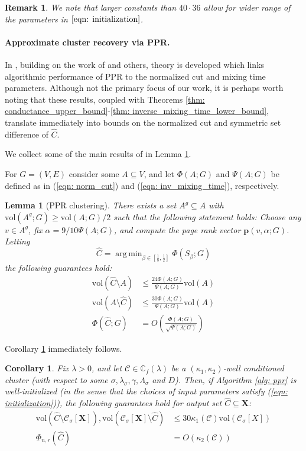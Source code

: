\documentclass{article}
\newcommand{\vol}{\mathrm{vol}}
\newcommand{\1}{\mathbf{1}}
\newcommand{\pbf}{\mathbf{p}}
\newcommand{\Xbf}{\mathbf{X}}
\newcommand{\Cbb}{\mathbb{C}}
\newcommand{\Cset}{\mathcal{C}}
\newcommand{\Csig}{\Cset_{\sigma}}
\DeclareMathOperator*{\argmin}{arg\,min}
\theoremstyle{aldenthm}
\newtheorem{lemma}{Lemma}
\newtheorem{corollary}{Corollary}
\theoremstyle{aldenrmrk}
\newtheorem{remark}{Remark}
\begin{document}
\begin{remark}
	We note that larger constants than $40 \cdot 36$ allow for wider range of the parameters in $\eqref{eqn: initialization}$. 
\end{remark}
\paragraph{Approximate cluster recovery via PPR.}

In \cite{zhu2013}, building on the work of \cite{anderson2006} and others, theory is developed which links algorithmic performance of PPR to the normalized cut and mixing time parameters. Although not the primary focus of our work, it is perhaps worth noting that these results, coupled with Theorems \ref{thm: conductance_upper_bound}-\ref{thm: inverse_mixing_time_lower_bound}, translate immediately into bounds on the normalized cut and symmetric set difference of $\widehat{C}$.  

We collect some of the main results of \cite{zhu2013} in Lemma \ref{lem: ppr_cluster}.

For $G = (V,E)$ consider some $A \subseteq V$, and let $\Phi(A; G)$ and $\Psi(A; G)$ be defined as in (\ref{eqn: norm_cut}) and (\ref{eqn: inv_mixing_time}), respectively.
\begin{lemma}[PPR clustering]
	\label{lem: ppr_cluster}
	There exists a set $A^g \subseteq A$ with $\vol(A^g;G) \geq \vol(A;G)/2$ such that the following statement holds: Choose any $v \in A^g$, fix $\alpha = 9 / 10 \Psi(A; G)$, and compute the page rank vector $\pbf(v,\alpha; G)$. Letting 
	\begin{equation*}
	\widehat{C} = \argmin_{\beta \in [\frac{1}{8}, \frac{1}{2}]} \Phi(S_{\beta}; G)
	\end{equation*}
	the following guarantees hold:
	\begin{align*}
	\vol(\widehat{C} \setminus A) & \leq \frac{24 \Phi(A; G)}{\Psi(A; G)} \vol(A) \\
	\vol(A \setminus \widehat{C})  & \leq \frac{30 \Phi(A; G)}{\Psi(A; G)} \vol(A) \\
	\Phi(\widehat{C}; G) & = O\left(\frac{\Phi(A; G)}{\sqrt{\Psi(A; G)}}\right)
	\end{align*}
\end{lemma}

Corollary \ref{cor: ppr_cluster} immediately follows.
\begin{corollary}
	\label{cor: ppr_cluster}
	Fix $\lambda > 0$, and let $\Cset \in \Cbb_f(\lambda)$ be a $(\kappa_1,\kappa_2)$-well conditioned cluster (with respect to some $\sigma, \lambda_{\sigma}, \gamma, \Lambda_{\sigma}$ and $D$). Then, if Algorithm \ref{alg: ppr} is well-initialized (in the sense that the choices of input parameters satisfy (\ref{eqn: initialization})), the following guarantees hold for output set $\widehat{C} \subseteq \Xbf$:
	\begin{align*}
	\vol(\widehat{C} \setminus \Csig[\Xbf]), \vol(\Csig[\Xbf] \setminus \widehat{C})  & \leq 30 \kappa_1(\Cset) \vol(\Csig[X]) \\
	\Phi_{n,r}(\widehat{C}) & = O\left(\kappa_2(\Cset)\right)
	\end{align*}
\end{corollary} 
\end{document}

